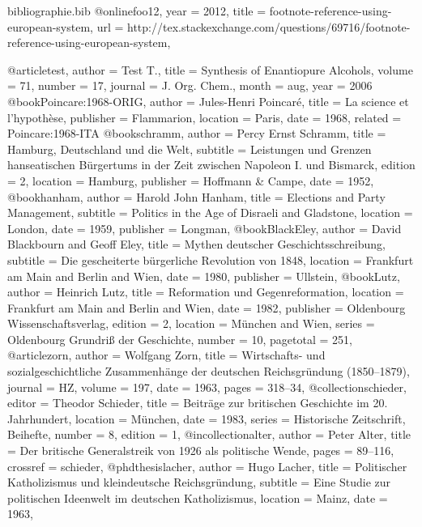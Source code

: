 
\begin{filecontents}{bibliographie.bib}
@online{foo12,
    year  = {2012},
    title = {footnote-reference-using-european-system},
    url   = {http://tex.stackexchange.com/questions/69716/footnote-reference-using-european-system},
}

@article{test,
    author   = {Test T.},
    title    = {Synthesis of Enantiopure Alcohols},
    volume   = {71},
    number   = {17},
    journal  = {J. Org. Chem.},
    month    = {aug},
    year     = {2006}
}
@book{Poincare:1968-ORIG,
    author    = {Jules-Henri Poincaré},
    title     = {La science et l’hypothèse},
    publisher = {Flammarion},
    location  = {Paris},
    date      = {1968},
    related   = {Poincare:1968-ITA}
}
@book{schramm,
    author    = {Percy Ernst Schramm},
    title     = {Hamburg, Deutschland und die Welt},
    subtitle  = {Leistungen und Grenzen hanseatischen Bürgertums in der Zeit zwischen Napoleon I. und Bismarck},
    edition   = {2},
    location  = {Hamburg},
    publisher = {Hoffmann \& Campe},
    date      = {1952},
}
@book{hanham,
    author    = {Harold John Hanham},
    title     = {Elections and Party Management},
    subtitle  = {Politics in the Age of Disraeli and Gladstone},
    location  = {London},
    date      = {1959},
    publisher = {Longman},
}
@book{BlackEley,
    author    = {David Blackbourn and Geoff Eley},
    title     = {Mythen deutscher Geschichtsschreibung},
    subtitle  = {Die gescheiterte bürgerliche Revolution von 1848},
    location  = {Frankfurt am Main and Berlin and Wien},
    date      = {1980},
    publisher = {Ullstein},
}
@book{Lutz,
    author    = {Heinrich Lutz},
    title     = {Reformation und Gegenreformation},
    location  = {Frankfurt am Main and Berlin and Wien},
    date      = {1982},
    publisher = {Oldenbourg Wissenschaftsverlag},
    edition   = {2},
    location  = {München and Wien},
    series    = {Oldenbourg Grundriß der Geschichte},
    number    = {10},
    pagetotal = {251},
}
@article{zorn,
    author    = {Wolfgang Zorn},
    title     = {Wirtschafts- und sozialgeschichtliche Zusammenhänge der deutschen Reichsgründung (1850–1879)},
    journal   = {HZ},
    volume    = {197},
    date      = {1963},
    pages     = {318–34},
}
@collection{schieder,
    editor    = {Theodor Schieder},
    title     = {Beiträge zur britischen Geschichte im 20. Jahrhundert},
    location  = {München},
    date      = {1983},
    series    = {Historische Zeitschrift, Beihefte},
    number    = {8},
    edition   = {1},
}
@incollection{alter,
    author    = {Peter Alter},
    title     = {Der britische Generalstreik von 1926 als politische Wende},
    pages     = {89–116},
    crossref  = {schieder},
}
@phdthesis{lacher,
    author   = {Hugo Lacher},
    title    = {Politischer Katholizismus und kleindeutsche Reichsgründung},
    subtitle = {Eine Studie zur politischen Ideenwelt im deutschen Katholizismus},
    location = {Mainz},
    date     = {1963},
}
\end{filecontents}
